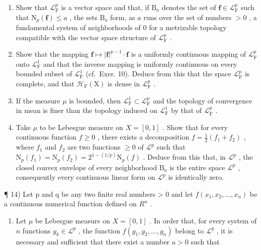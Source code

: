 \begin{enumerate}
\def\labelenumi{\alph{enumi})}
\item
  Show that \(\mathcal{L}_{\mathrm{F}}^{p}\) is a vector space and that, if \(\mathrm{B}_a\) denotes the set of \(\mathbf{f} \in \mathcal{L}_{\mathrm{F}}^{p}\) such that \(\mathrm{N}_p(\mathbf{f}) \leqslant a\) , the sets \(\mathrm{B}_a\) form, as \(a\) runs over the set of numbers \(>0\) , a fundamental system of neighborhoods of 0 for a metrizable topology compatible with the vector space structure of \(\mathcal{L}_{\mathrm{F}}^{p}\) .
\item
  Show that the mapping \(\mathbf{f} \mapsto |\mathbf{f}|^{p-1} \cdot \mathbf{f}\) is a uniformly continuous mapping of \(\mathcal{L}_{\mathrm{F}}^{p}\) onto \(\mathcal{L}_{\mathrm{F}}^{1}\) and that the inverse mapping is uniformly continuous on every bounded subset of \(\mathcal{L}_{\mathrm{F}}^{1}\) (cf.~Exer. 10). Deduce from this that the space \(\mathcal{L}_{\mathrm{F}}^{p}\) is complete, and that \(\mathcal{H}_{\mathrm{F}}(\mathrm{X})\) is dense in \(\mathcal{L}_{\mathrm{F}}^{p}\) .
\item
  If the measure \(\mu\) is bounded, then \(\mathcal{L}_{\mathrm{F}}^{1} \subset \mathcal{L}_{\mathrm{F}}^{p}\) and the topology of convergence in mean is finer than the topology induced on \(\mathcal{L}_{\mathrm{F}}^{1}\) by that of \(\mathcal{L}_{\mathrm{F}}^{p}\) .
\item
  Take \(\mu\) to be Lebesgue measure on \(X = [0,1]\) . Show that for every continuous function \(f \geqslant 0\) , there exists a decomposition \(f = \frac{1}{2}(f_1 + f_2)\) , where \(f_1\) and \(f_2\) are two functions \(\geqslant 0\) of \(\mathcal{L}^p\) such that \(\mathrm{N}_p(f_1) = \mathrm{N}_p(f_2) = 2^{1 - (1/p)}\mathrm{N}_p(f)\) . Deduce from this that, in \(\mathcal{L}^p\) , the closed convex envelope of every neighborhood \(\mathrm{B}_a\) is the entire space \(\mathcal{L}^p\) , consequently every continuous linear form on \(\mathcal{L}^p\) is identically zero.
\end{enumerate}

¶ 14) Let p and q be any two finite real numbers \textgreater{} 0 and let \(f(x_{1}, x_{2}, \ldots, x_{n})\) be a continuous numerical function defined on \(R^{n}\) .

\begin{enumerate}
\def\labelenumi{\alph{enumi})}
\tightlist
\item
  Let \(\mu\) be Lebesgue measure on \(X = [0,1]\) . In order that, for every system of \(n\) functions \(g_k \in \mathcal{L}^p\) , the function \(f(g_1, g_2, \ldots, g_n)\) belong to \(\mathcal{L}^q\) , it is necessary and sufficient that there exist a number \(a > 0\) such that
\end{enumerate}


